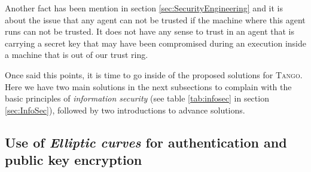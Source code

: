 \documentclass[10pt,a4paper,twoside]{llncs}
\newcommand{\todo}[1]{\texttt{\color{red}TODO:} ``\emph{#1}''}
\newcommand{\tango}{\textsc{Tango}}
\begin{document}
Another fact has been mention in section \ref{sec:SecurityEngineering} and it is about the issue that any agent can not be trusted if the machine where this agent runs can not be trusted. It does not have any sense to trust in an agent that is carrying a secret key that may have been compromised during an execution inside a machine that is out of our trust ring.

Once said this points, it is time to go inside of the proposed solutions for \tango. Here we have two main solutions in the next subsections to complain with the basic principles of \emph{information security} (see table \ref{tab:infosec} in section \ref{sec:InfoSec}), followed by two introductions to advance solutions.

\subsection{Use of \emph{Elliptic curves} for authentication and public key encryption}\label{sec:authentication}

\end{document}
